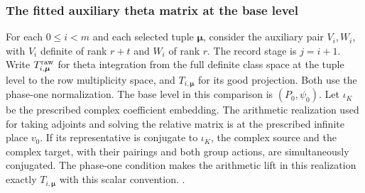 \subsubsection{The fitted auxiliary theta matrix at the base level}
\label{sec:period-fitted-stage}

For each \(0\le i<m\) and each selected tuple
\(\boldsymbol\mu\), consider the auxiliary pair
\(V_i,W_i\), with \(V_i\) definite of rank \(r+t\) and \(W_i\)
of rank \(r\). The record stage is \(j=i+1\). Write \(T^{\rm raw}_{i,\boldsymbol\mu}\)
for theta integration from the full definite class space at the
tuple level to the row multiplicity space, and \(T_{i,\boldsymbol\mu}\)
for its good projection. Both use the phase-one normalization.
The base level in this comparison is \((P_0,\psi_0)\).
Let \(\iota_K\) be the prescribed complex coefficient embedding.
The arithmetic realization used for taking adjoints and solving the
relative matrix is at the prescribed infinite place \(v_0\).
If its representative is conjugate to \(\iota_K\), the complex
source and the complex target, with their pairings and both group
actions, are simultaneously conjugated. The phase-one condition
makes the arithmetic lift in this realization exactly \(T_{i,\boldsymbol\mu}\)
with this scalar convention.
.

